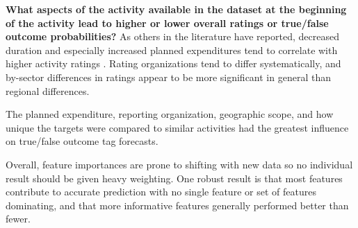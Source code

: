 \textbf{What aspects of the activity available in the dataset at the beginning of the activity lead to higher or lower overall ratings or true/false outcome probabilities?}
As others in the literature have reported, decreased duration and especially increased planned expenditures tend to correlate with higher activity ratings \citep{vivaltHowMuchCan2020} \citep{ashtonPuzzleMissingPieces2023} \citep{eilersVolumeRiskComplexitya}. Rating organizations tend to differ systematically, and by-sector differences in ratings appear to be more significant in general than regional differences.

The planned expenditure, reporting organization, geographic scope, and how unique the targets were compared to similar activities had the greatest influence on true/false outcome tag forecasts. 

Overall, feature importances are prone to shifting with new data so no individual result should be given heavy weighting. One robust result is that most features contribute to accurate prediction with no single feature or set of features dominating, and that more informative features generally performed better than fewer.
\clearpage




